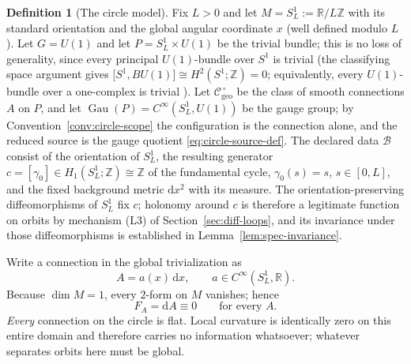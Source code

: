 \documentclass[11pt,a4paper]{article}
\theoremstyle{plain}
\theoremstyle{definition}
\newtheorem{definition}[theorem]{Definition}
\theoremstyle{remark}
\newcommand{\Real}{\mathbb{R}}
\newcommand{\Int}{\mathbb{Z}}
\newcommand{\Cgeo}{\mathcal{C}_{\mathrm{geo}}}
\newcommand{\Gau}{\operatorname{Gau}}
\begin{document}
\begin{definition}[The circle model]
\label{def:circle-model}
Fix $L>0$ and let $M=S^1_L:=\Real/L\Int$ with its standard orientation and the global angular
coordinate $x$ (well defined modulo $L$). Let $G=U(1)$ and let $P=S^1_L\times U(1)$ be the trivial
bundle; this is no loss of generality, since every principal $U(1)$-bundle over $S^1$ is trivial
(the classifying space argument gives
$\bigl[S^1,BU(1)\bigr]\cong H^2(S^1;\Int)=0$; equivalently, every $U(1)$-bundle over a
one-complex is trivial \cite{Steenrod}). Let $\Cgeo^{\,\circ}$ be the class of smooth connections
$A$ on $P$, and let $\Gau(P)=C^\infty(S^1_L,U(1))$ be the gauge group; by
Convention~\ref{conv:circle-scope} the configuration is the connection alone, and the reduced source
is the gauge quotient \eqref{eq:circle-source-def}. The declared data $\mathcal{B}$ consist of the
orientation of $S^1_L$, the resulting generator
$c=[\gamma_0]\in H_1(S^1_L;\Int)\cong\Int$ of the fundamental cycle, $\gamma_0(s)=s$, $s\in[0,L]$,
and the fixed background metric $\mathrm{d}x^{2}$ with its measure. The orientation-preserving
diffeomorphisms of $S^1_L$ fix $c$; holonomy around $c$ is therefore a legitimate function on orbits
by mechanism (L3) of Section~\ref{sec:diff-loops}, and its invariance under those diffeomorphisms is
established in Lemma~\ref{lem:spec-invariance}.
\end{definition}

Write a connection in the global trivialization as
\begin{equation}
\label{eq:A-circle}
A=a(x)\,\mathrm{d}x,
\qquad a\in C^\infty(S^1_L,\Real) .
\end{equation}
Because $\dim M=1$, every $2$-form on $M$ vanishes; hence
\begin{equation}
\label{eq:flat}
F_A=\mathrm{d}A\equiv 0 \qquad\text{for every }A .
\end{equation}
\emph{Every} connection on the circle is flat. Local curvature is identically zero on this entire
domain and therefore carries no information whatsoever; whatever separates orbits here must be
global.
\end{document}
